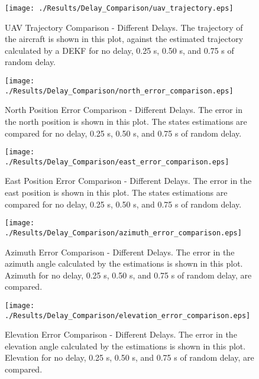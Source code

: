 \begin{figure}[H]
  \centering
  \texttt{[image: ./Results/Delay\_Comparison/uav\_trajectory.eps]}
  \caption[UAV Trajectory Comparison - Different Delays]{UAV Trajectory Comparison - Different Delays. The trajectory of the aircraft is shown in this plot, against the estimated trajectory calculated by a DEKF for no delay, 0.25 s, 0.50 s, and 0.75 s of random delay.}
\end{figure}

\begin{figure}[H]
  \centering
  \texttt{[image: ./Results/Delay\_Comparison/north\_error\_comparison.eps]}
  \caption[North Position Error Comparison - Different Delays]{North Position Error Comparison - Different Delays. The error in the north position is shown in this plot. The states estimations are compared for no delay, 0.25 s, 0.50 s, and 0.75 s of random delay.}
\end{figure}
\begin{figure}[H]
  \centering
  \texttt{[image: ./Results/Delay\_Comparison/east\_error\_comparison.eps]}
  \caption[East Position Error Comparison - Different Delays]{East Position Error Comparison - Different Delays. The error in the east position is shown in this plot. The states estimations are compared for no delay, 0.25 s, 0.50 s, and 0.75 s of random delay.}
\end{figure}

\begin{figure}[H]
  \centering
  \texttt{[image: ./Results/Delay\_Comparison/azimuth\_error\_comparison.eps]}
  \caption[Azimuth Error Comparison - Different Delays]{Azimuth Error Comparison - Different Delays. The error in the azimuth angle calculated by the estimations is shown in this plot. Azimuth for no delay, 0.25 s, 0.50 s, and 0.75 s of random delay, are compared.}
\end{figure}

\begin{figure}[H]
  \centering
  \texttt{[image: ./Results/Delay\_Comparison/elevation\_error\_comparison.eps]}
  \caption[Elevation Error Comparison - Different Delays]{Elevation Error Comparison - Different Delays. The error in the elevation angle calculated by the estimations is shown in this plot. Elevation for no delay, 0.25 s, 0.50 s, and 0.75 s of random delay, are compared.}
\end{figure}

